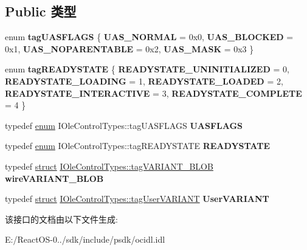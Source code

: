 \subsection*{Public 类型}
\begin{DoxyCompactItemize}
\item 
\mbox{\label{interface_i_ole_control_types_ad28bfa726c30fa92130f234efb2deab7}} 
enum {\bfseries tag\+U\+A\+S\+F\+L\+A\+GS} \{ {\bfseries U\+A\+S\+\_\+\+N\+O\+R\+M\+AL} = 0x0, 
{\bfseries U\+A\+S\+\_\+\+B\+L\+O\+C\+K\+ED} = 0x1, 
{\bfseries U\+A\+S\+\_\+\+N\+O\+P\+A\+R\+E\+N\+T\+A\+B\+LE} = 0x2, 
{\bfseries U\+A\+S\+\_\+\+M\+A\+SK} = 0x3
 \}
\item 
\mbox{\label{interface_i_ole_control_types_a653d551d64203063345140b476fde4b7}} 
enum {\bfseries tag\+R\+E\+A\+D\+Y\+S\+T\+A\+TE} \{ \newline
{\bfseries R\+E\+A\+D\+Y\+S\+T\+A\+T\+E\+\_\+\+U\+N\+I\+N\+I\+T\+I\+A\+L\+I\+Z\+ED} = 0, 
{\bfseries R\+E\+A\+D\+Y\+S\+T\+A\+T\+E\+\_\+\+L\+O\+A\+D\+I\+NG} = 1, 
{\bfseries R\+E\+A\+D\+Y\+S\+T\+A\+T\+E\+\_\+\+L\+O\+A\+D\+ED} = 2, 
{\bfseries R\+E\+A\+D\+Y\+S\+T\+A\+T\+E\+\_\+\+I\+N\+T\+E\+R\+A\+C\+T\+I\+VE} = 3, 
\newline
{\bfseries R\+E\+A\+D\+Y\+S\+T\+A\+T\+E\+\_\+\+C\+O\+M\+P\+L\+E\+TE} = 4
 \}
\item 
\mbox{\label{interface_i_ole_control_types_ab199d88b6aa0985e9e2019fb55f208b2}} 
typedef \hyperlink{interfaceenum}{enum} I\+Ole\+Control\+Types\+::tag\+U\+A\+S\+F\+L\+A\+GS {\bfseries U\+A\+S\+F\+L\+A\+GS}
\item 
\mbox{\label{interface_i_ole_control_types_af2c0562cb7673079d40247e035600a5c}} 
typedef \hyperlink{interfaceenum}{enum} I\+Ole\+Control\+Types\+::tag\+R\+E\+A\+D\+Y\+S\+T\+A\+TE {\bfseries R\+E\+A\+D\+Y\+S\+T\+A\+TE}
\item 
\mbox{\label{interface_i_ole_control_types_abaeadc4c33a3d42bb50b189bc1476793}} 
typedef \hyperlink{interfacestruct}{struct} \hyperlink{struct_i_ole_control_types_1_1tag_v_a_r_i_a_n_t___b_l_o_b}{I\+Ole\+Control\+Types\+::tag\+V\+A\+R\+I\+A\+N\+T\+\_\+\+B\+L\+OB} {\bfseries wire\+V\+A\+R\+I\+A\+N\+T\+\_\+\+B\+L\+OB}
\item 
\mbox{\label{interface_i_ole_control_types_a60dc4faa541df0ef4c48b0eefa6db842}} 
typedef \hyperlink{interfacestruct}{struct} \hyperlink{struct_i_ole_control_types_1_1tag_user_v_a_r_i_a_n_t}{I\+Ole\+Control\+Types\+::tag\+User\+V\+A\+R\+I\+A\+NT} {\bfseries User\+V\+A\+R\+I\+A\+NT}
\end{DoxyCompactItemize}


该接口的文档由以下文件生成\+:\begin{DoxyCompactItemize}
\item 
E\+:/\+React\+O\+S-\/0../sdk/include/psdk/ocidl.\+idl\end{DoxyCompactItemize}

